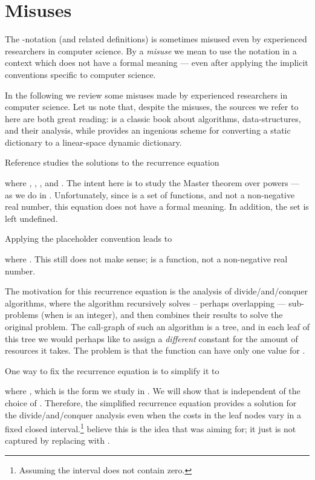 \documentclass[b5paper, english, oneside]{memoir}
\begin{document}
\section{Misuses}
\label{Misuses}

The -notation (and related definitions) is sometimes misused even by experienced researchers in computer science. By a \emph{misuse} we mean to use the notation in a context which does not have a formal meaning --- even after applying the implicit conventions specific to computer science. 

In the following we review some misuses made by experienced researchers in computer science. Let us note that, despite the misuses, the sources we refer to here are both great reading: \cite{IntroAlgo2009} is a classic book about algorithms, data-structures, and their analysis, while \cite{ExponentialTrees} provides an ingenious scheme for converting a static dictionary to a linear-space dynamic dictionary.

\begin{example}
Reference \cite[page 102]{IntroAlgo2009} studies the solutions to the recurrence equation

where , , , and . The intent here is to study the Master theorem over powers --- as we do in . Unfortunately, since  is a set of functions, and not a non-negative real number, this equation does not have a formal meaning. In addition, the set  is left undefined. 

Applying the placeholder convention leads to

where . This still does not make sense;  is a function, not a non-negative real number.

The motivation for this recurrence equation is the analysis of divide\-/and\-/conquer algorithms, where the algorithm recursively solves  -- perhaps overlapping --- sub-problems (when  is an integer), and then combines their results to solve the original problem. The call-graph of such an algorithm is a tree, and in each leaf of this tree we would perhaps like to assign a \emph{different} constant for the amount of resources it takes. The problem is that the function  can have only one value for .

One way to fix the recurrence equation is to simplify it to

where , which is the form we study in . We will show that  is independent of the choice of . Therefore, the simplified recurrence equation provides a solution for the divide\-/and\-/conquer analysis even when the costs in the leaf nodes vary in a fixed closed interval.\footnote{Assuming the interval does not contain zero.} \We{} believe this is the idea that \cite{IntroAlgo2009} was aiming for; it just is not captured by replacing  with .
\end{example}
\end{document}
